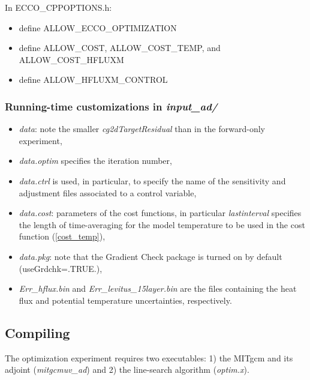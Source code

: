 In ECCO\_CPPOPTIONS.h:

\begin{itemize}
\item define ALLOW\_ECCO\_OPTIMIZATION 

\item define ALLOW\_COST, ALLOW\_COST\_TEMP, and ALLOW\_COST\_HFLUXM

\item define ALLOW\_HFLUXM\_CONTROL
\end{itemize}

\subsubsection{Running-time customizations in {\it input\_ad/}}

\begin{itemize}

\item {\it data}: note the smaller {\it cg2dTargetResidual} than in the
forward-only experiment,

\item {\it data.optim} specifies the iteration number,

\item {\it data.ctrl} is used, in particular, to specify the
name of the sensitivity and adjustment files associated to a control
variable,

\item {\it data.cost}: parameters of the cost functions, in particular
{\it lastinterval} specifies the length of time-averaging for the model
temperature to be used in the cost function (\ref{cost_temp}),

\item {\it data.pkg}: note that the Gradient Check package is turned on by
default (useGrdchk=.TRUE.),

\item {\it Err\_hflux.bin} and {\it Err\_levitus\_15layer.bin} are the
files containing the heat flux and potential temperature uncertainties,
respectively.

\end{itemize}

\subsection{Compiling} 

The optimization experiment requires two executables: 1) the 
MITgcm and its adjoint ({\it mitgcmuv\_ad}) and 2) the line-search
algorithm ({\it optim.x}).


